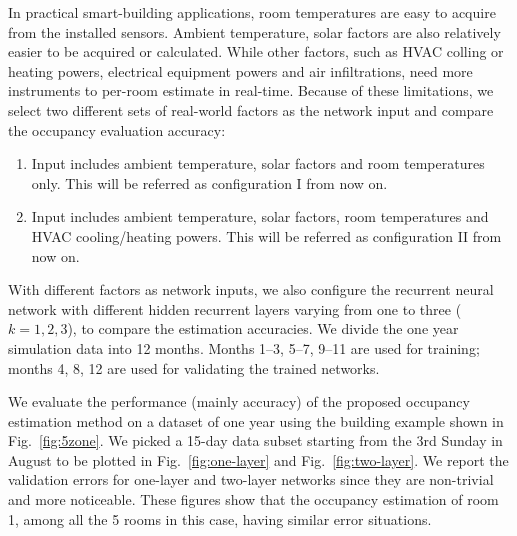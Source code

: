 In practical smart-building applications, room temperatures are easy to acquire
from the installed sensors. Ambient temperature, solar factors are also
relatively easier to be acquired or calculated. While other factors, such as
HVAC colling or heating powers, electrical equipment powers and air
infiltrations, need more instruments to per-room estimate in real-time. Because
of these limitations, we select two different sets of real-world factors as the
network input and compare the occupancy evaluation accuracy:
\begin{enumerate}
    \item Input includes ambient temperature, solar factors and room
    temperatures only. This will be referred as configuration I from now on.

    \item Input includes ambient temperature, solar factors, room temperatures
    and HVAC cooling\slash{}heating powers. This will be referred as configuration II from now on.
\end{enumerate}
With different factors as network inputs, we also configure the recurrent
neural network with different hidden recurrent layers varying from one to
three ($k=1,2,3$), to compare the estimation accuracies. We divide the one year
simulation data into 12 months. Months 1--3, 5--7, 9--11 are used for training;
months 4, 8, 12 are used for validating the trained networks.

We evaluate the performance (mainly accuracy) of the
proposed occupancy estimation method on a dataset of one year using
the building example shown in Fig.~\ref{fig:5zone}.  We picked a
15-day data subset starting from the 3rd Sunday in August to be
plotted in Fig.~\ref{fig:one-layer} and Fig.~\ref{fig:two-layer}. We
report the validation errors for one-layer and two-layer networks
since they are non-trivial and more noticeable. These figures show
that the occupancy estimation of room 1, among all the 5 rooms in this
case, having similar error situations.



